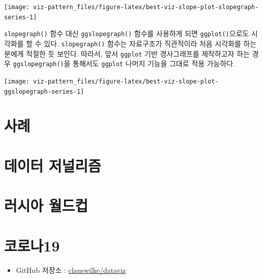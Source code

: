 \documentclass[
]{book}
\providecommand{\tightlist}{%
  \setlength{\itemsep}{0pt}\setlength{\parskip}{0pt}}
\begin{document}
\begin{center}\texttt{[image: viz-pattern\_files/figure-latex/best-viz-slope-plot-slopegraph-series-1]} \end{center}

\texttt{slopegraph()} 함수 대신 \texttt{ggslopegraph()} 함수를 사용하게 되면 \texttt{ggplot()}으로도 시각화를 할 수 있다.
\texttt{slopegraph()} 함수는 자료구조가 직관적이라 처음 시각화를 하는 분에게 적절한 듯 보인다.
따라서, 앞서 \texttt{ggplot} 기반 경사그래프를 제작하고자 하는 경우 \texttt{ggslopegraph()}을 통해서도 \texttt{ggplot} 나머지 기능을 그대로 적용 가능하다.

\begin{center}\texttt{[image: viz-pattern\_files/figure-latex/best-viz-slope-plot-ggslopegraph-series-1]} \end{center}

\hypertarget{uxc0acuxb840}{%
\chapter*{사례}\label{uxc0acuxb840}}

\hypertarget{case-journalism}{%
\chapter{데이터 저널리즘}\label{case-journalism}}

\hypertarget{case-worldcup}{%
\chapter{러시아 월드컵}\label{case-worldcup}}

\hypertarget{case-corona}{%
\chapter{코로나19}\label{case-corona}}

\begin{itemize}
\tightlist
\item
  GitHub 저장소 : \href{https://github.com/clauswilke/dataviz}{clauswilke/dataviz}
\end{itemize}

  
\end{document}

